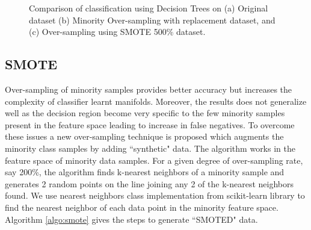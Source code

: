\documentclass[10pt,journal,compsoc]{IEEEtran}
\begin{document}
\begin{figure}[!t]
\centering
{}
\hfil
{}
\hfil
{}
\caption{Comparison of classification using Decision Trees on (a) Original dataset (b) Minority Over-sampling with replacement dataset, and (c) Over-sampling using SMOTE 500\% dataset.}
\label{fig:compare}
\end{figure}

\subsection{SMOTE}
Over-sampling of minority samples provides better accuracy but increases the complexity of classifier learnt manifolds. 
Moreover, the results does not generalize well as the decision region become very specific to the few minority samples present in the feature space leading to increase in false negatives.
To overcome these issues a new over-sampling technique is proposed which augments the minority class samples by adding ``synthetic" data.
The algorithm works in the feature space of minority data samples.
For a given degree of over-sampling rate, say 200\%, the algorithm finds k-nearest neighbors of a minority sample and generates 2 random points on the line joining any 2 of the k-nearest neighbors found.
We use nearest neighbors class implementation from scikit-learn library to find the nearest neighbor of each data point in the minority feature space.
Algorithm \ref{algo:smote} gives the steps to generate ``SMOTED" data.
\end{document}
